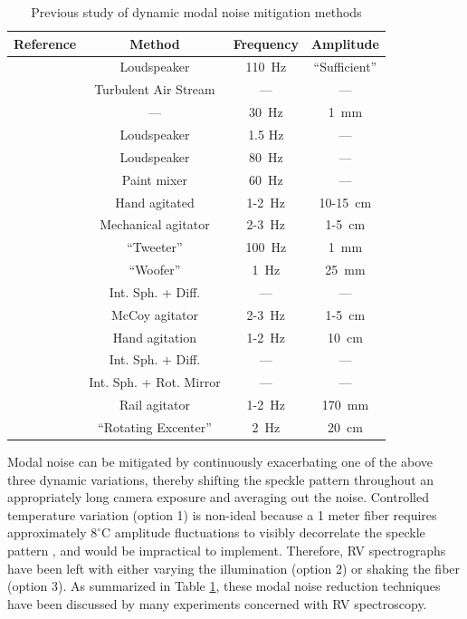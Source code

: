 \documentclass[twocolumn]{emulateapj}
\begin{document}
\begin{table}
\centering
\caption{Previous study of dynamic modal noise mitigation methods}
	\begin{tabular}{cccc}
		\hline
		Reference & Method & Frequency & Amplitude \\
		\hline\hline
		\citet{Daino1980} & Loudspeaker & \SI{110}{\hertz} & ``Sufficient'' \\
		\hline
		\citet{Hill1980} & Turbulent Air Stream & --- & --- \\
		\hline
		\citet{Baudrand2001} & --- & \SI{30}{\hertz} & \SI{1}{\milli\meter} \\
		\hline
		\multirow{2}{*}{\citet{Lemke2011}} & Loudspeaker & 1.5 Hz & --- \\
		 & Loudspeaker & \SI{80}{\hertz} & --- \\
		\hline
		\multirow{3}{*}{\citet{McCoy2012}} & Paint mixer & \SI{60}{\hertz} & --- \\
		 & Hand agitated & 1-\SI{2}{\hertz} & 10-\SI{15}{\centi\meter} \\
		 & Mechanical agitator & 2-\SI{3}{\hertz} & 1-\SI{5}{\centi\meter} \\
		\hline
		\multirow{2}{*}{\citet{Plavchan2013}} & ``Tweeter'' & \SI{100}{\hertz} & \SI{1}{\milli\meter} \\
		 & ``Woofer'' & \SI{1}{\hertz} & \SI{25}{\milli\meter} \\
		\hline
		\multirow{3}{*}{\citet{Mahadevan2014}} & Int. Sph. + Diff. & --- & ---\\
		 & McCoy agitator & 2-\SI{3}{\hertz} & 1-\SI{5}{\centi\meter} \\
		 & Hand agitation & 1-\SI{2}{\hertz} & \SI{10}{\centi\meter} \\
		\hline
		\multirow{2}{*}{\citet{Halverson2014}} & Int. Sph. + Diff. & --- & --- \\
		 & Int. Sph. + Rot. Mirror & --- & --- \\
		\hline		
		\citet{Roy2014} & Rail agitator & 1-\SI{2}{\hertz} & \SI{170}{\milli\meter} \\
		\hline
		\citet{Sablowski2015} & ``Rotating Excenter'' & \SI{2}{\hertz} & \SI{20}{\centi\meter} \\
		\hline
	\end{tabular}
\label{table:previous_studies}
\end{table}

Modal noise can be mitigated by continuously exacerbating one of the above three dynamic variations, thereby shifting the speckle pattern throughout an appropriately long camera exposure and averaging out the noise. Controlled temperature variation (option 1) is non-ideal because a 1 meter fiber requires approximately $8 ^\circ \mathrm{C}$ amplitude fluctuations to visibly decorrelate the speckle pattern \citep{Redding2013}, and would be impractical to implement. Therefore, RV spectrographs have been left with either varying the illumination (option 2) or shaking the fiber (option 3). As summarized in Table \ref{table:previous_studies}, these modal noise reduction techniques have been discussed by many experiments concerned with RV spectroscopy.
\end{document}
